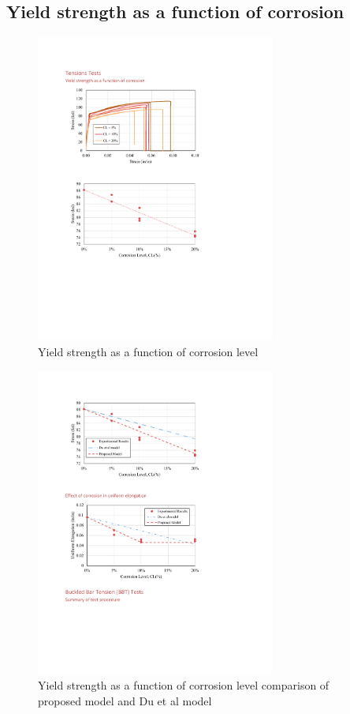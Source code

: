 \subsection{Yield strength as a function of corrosion}
\begin{figure}[htbp]
	\centering
	\includegraphics[width=0.7\textwidth]{VAC Thesis 2.0/Chapter-4/figs/TensionTest_results_2.pdf}
	\caption{Yield strength as a function of corrosion level}
	\label{fig:YieldStrength_vs_CL}
\end{figure}
\begin{figure}[htbp]
	\centering
	\includegraphics[width=0.7\textwidth]{VAC Thesis 2.0/Chapter-4/figs/TensionTest_results_3_proposedmodel.pdf}
	\caption{Yield strength as a function of corrosion level comparison of proposed model and Du et al model \cite{Du2005}}
	\label{fig:TensionTestResults_StressStrain}
\end{figure}
